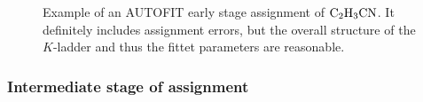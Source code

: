 \documentclass[11pt]{article}
\begin{document}
\begin{figure}[h]
\caption{\small Example of an AUTOFIT early stage assignment of $\rm C_2H_3CN$. It definitely includes assignment errors, but the overall structure of the $K$-ladder and thus the fittet parameters are reasonable.}
\label{fig:vyn_autofit}
\end{figure}






\subsubsection{Intermediate stage of assignment}
\end{document}

